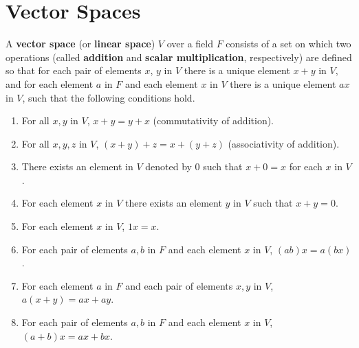 \section{Vector Spaces}\label{sec 1.2}

\begin{definition}\label{1.2.1}
    A \textbf{vector space} (or \textbf{linear space}) $V$ over a field $F$ consists of a set on which two operations (called \textbf{addition} and \textbf{scalar multiplication}, respectively) are deﬁned so that for each pair of elements $x$, $y$ in $V$ there is a unique element $x + y$ in $V$, and for each element $a$ in $F$ and each element $x$ in $V$ there is a unique element $ax$ in $V$, such that the following conditions hold.
    \begin{enumerate}
        \item For all $x, y$ in $V$, $x + y = y + x$
              (commutativity of addition).
        \item For all $x, y, z$ in $V$, $(x + y) + z = x + (y + z)$
              (associativity of addition).
        \item There exists an element in $V$ denoted by $0$ such that $x + 0 = x$ for each $x$ in $V$.
        \item For each element $x$ in $V$ there exists an element $y$ in $V$ such that $x + y = 0$.
        \item For each element $x$ in $V$, $1x = x$.
        \item For each pair of elements $a, b$ in $F$ and each element $x$ in $V$, $(ab)x = a(bx)$.
        \item For each element $a$ in $F$ and each pair of elements $x, y$ in $V$, $a(x + y) = ax + ay$.
        \item For each pair of elements $a, b$ in $F$ and each element $x$ in $V$, $(a + b)x = ax + bx$.
    \end{enumerate}
\end{definition}